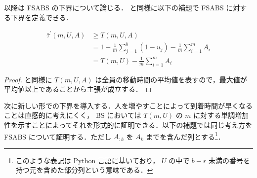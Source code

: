 以降は FSABS の下界について論じる．  と同様に以下の補題で FSABS に対する下界を定義できる．
\begin{lemma}\label{lemma:fsabs-lower-bound-absolute}
  \begin{align}
    \bar\tau^{\prime}(m, U, A) &\geq T(m, U, A) \\
                      &= 1 - \frac{1}{m}\sum_{j = 1}^b (1 - u_j) - \frac{1}{m}\sum_{i = 1}^{m} A_i \\
                      &= T(m, U) - \frac{1}{m}\sum_{i = 1}^{m} A_i
  \end{align}
\end{lemma}
\begin{proof}
   と同様に $T(m, U, A)$ は全員の移動時間の平均値を表すので，最大値が平均値以上であることから主張が成立する．
\end{proof}

次に新しい形での下界を導入する．人を増やすことによって到着時間が早くなることは直感的に考えにくく， BS においては $T(m, U)$ の $m$ に対する単調増加性を示すことによってそれを形式的に証明できる．以下の補題では同じ考え方を FSABS について証明する．ただし $A_{:k}$ を $A_k$ までを含んだ列とする\footnote{このような表記は Python 言語に基いており， $U$ の中で $b-r$ 未満の番号を持つ元を含めた部分列という意味である．}．

